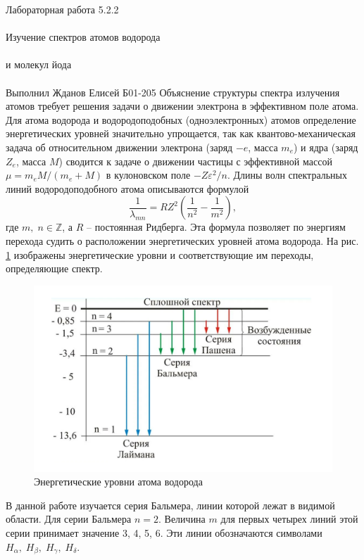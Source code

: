 \documentclass{astroedu-lab}
\begin{document}
\begin{problem}{\huge Лабораторная работа 5.2.2\\\\Изучение спектров атомов водорода\\\\и молекул йода\\\\Выполнил Жданов Елисей Б01-205}
	Объяснение структуры спектра излучения атомов требует решения задачи о движении электрона в эффективном поле атома.	Для атома водорода и водородоподобных (одноэлектронных) атомов 	определение энергетических уровней значительно упрощается, так как	квантово-механическая задача об относительном движении электрона (заряд $ -e $, масса $ m_e $) и ядра (заряд $ Z_e $, масса $ M $) сводится к задаче о движении частицы с эффективной массой $ \mu = m_e M /(m_e+M) $ в кулоновском поле $ - Z \varepsilon^2 / n $. Длины волн спектральных линий водородоподобного атома описываются формулой
	\begin{equation}\label{key}
		\dfrac{1}{\lambda_{m n}} = R Z^2 \left(\dfrac{1}{n^2}-\dfrac{1}{m^2}\right),
	\end{equation}
	где $ m, \;n \in \mathbb{Z} $, а $ R $ -- постоянная Ридберга.
	Эта формула позволяет по энергиям перехода судить о расположении энергетических уровней атома водорода. На рис. \ref{fig:screenshot1} изображены энергетические уровни и соответствующие им переходы, определяющие спектр.
	\begin{figure}
		\includegraphics[width=1.0\linewidth]{Screenshot_1}
		\caption{Энергетические уровни атома водорода}
		\label{fig:screenshot1}
	\end{figure}
	В данной работе изучается серия Бальмера, линии которой лежат в видимой области. Для серии Бальмера $ n = 2 $. Величина $ m $ для первых четырех линий этой серии принимает значение 3, 4, 5, 6. Эти линии	обозначаются символами $ H_\alpha,\;H_\beta,\;H_\gamma,\;H_\delta $.
	

\end{problem}
\end{document}
